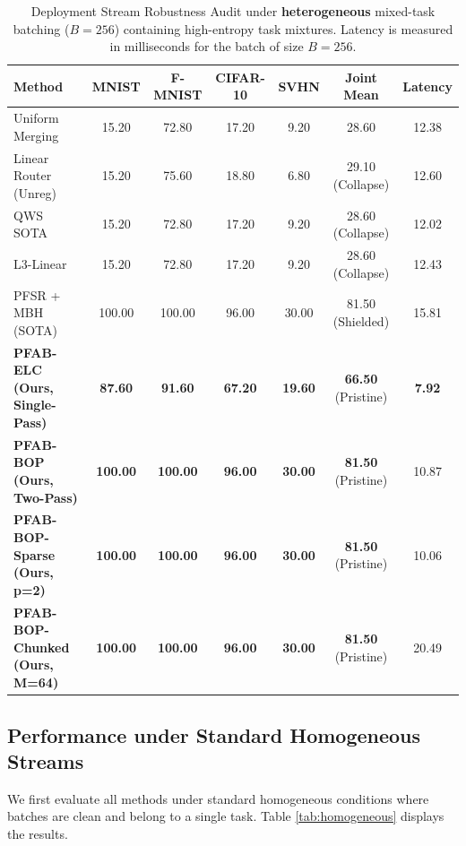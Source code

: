 \begin{table}[t]
  \caption{Deployment Stream Robustness Audit under \textbf{heterogeneous} mixed-task batching ($B=256$) containing high-entropy task mixtures. Latency is measured in milliseconds for the batch of size $B=256$.}
  \label{tab:heterogeneous}
  \vskip 0.15in
  \begin{center}
  \begin{small}
  \begin{sc}
  \setlength{\tabcolsep}{3.5pt}
  \begin{tabular}{lcccccc}
    \toprule
    Method & MNIST & F-MNIST & CIFAR-10 & SVHN & Joint Mean & Latency \\
    \midrule
    Uniform Merging & 15.20 & 72.80 & 17.20 & 9.20 & 28.60 & 12.38 \\
    Linear Router (Unreg) & 15.20 & 75.60 & 18.80 & 6.80 & 29.10 (Collapse) & 12.60 \\
    QWS SOTA \cite{qws2025} & 15.20 & 72.80 & 17.20 & 9.20 & 28.60 (Collapse) & 12.02 \\
    L3-Linear & 15.20 & 72.80 & 17.20 & 9.20 & 28.60 (Collapse) & 12.43 \\
    PFSR + MBH (SOTA) \cite{subspace2026} & 100.00 & 100.00 & 96.00 & 30.00 & 81.50 (Shielded) & 15.81 \\
    \midrule
    \textbf{PFAB-ELC (Ours, Single-Pass)} & \textbf{87.60} & \textbf{91.60} & \textbf{67.20} & \textbf{19.60} & \textbf{66.50} (Pristine) & \textbf{7.92} \\
    \textbf{PFAB-BOP (Ours, Two-Pass)} & \textbf{100.00} & \textbf{100.00} & \textbf{96.00} & \textbf{30.00} & \textbf{81.50} (Pristine) & 10.87 \\
    \textbf{PFAB-BOP-Sparse (Ours, p=2)} & \textbf{100.00} & \textbf{100.00} & \textbf{96.00} & \textbf{30.00} & \textbf{81.50} (Pristine) & 10.06 \\
    \textbf{PFAB-BOP-Chunked (Ours, M=64)} & \textbf{100.00} & \textbf{100.00} & \textbf{96.00} & \textbf{30.00} & \textbf{81.50} (Pristine) & 20.49 \\
    \bottomrule
  \end{tabular}
  \end{sc}
  \end{small}
  \end{center}
  \vskip -0.1in
\end{table}

\subsection{Performance under Standard Homogeneous Streams}
We first evaluate all methods under standard homogeneous conditions where batches are clean and belong to a single task. Table \ref{tab:homogeneous} displays the results.

